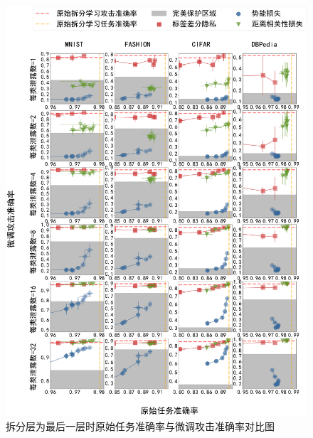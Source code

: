 \begin{figure}[h!]
    \centering
    \includegraphics[width=1\linewidth]{Z_Resources/peloss_fine-tuning}
    \caption{拆分层为最后一层时原始任务准确率与微调攻击准确率对比图}
    \label{fig:peloss:fine-tuning}
\end{figure}


